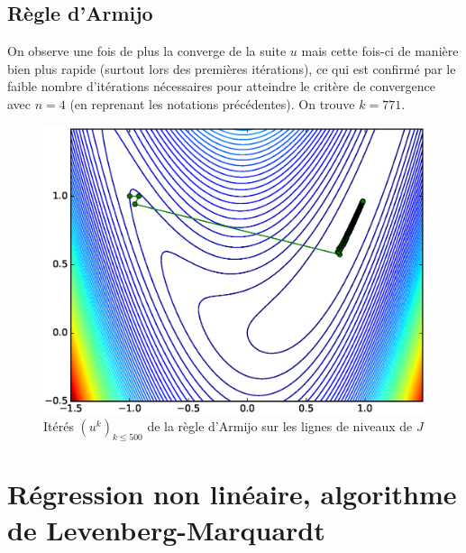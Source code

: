 \documentclass[paper=a4, fontsize=11pt]{article}
\begin{document}
\subsection{Règle d'Armijo}
On observe une fois de plus la converge de la suite $u$ mais cette fois-ci de manière bien plus rapide (surtout lors des premières itérations), ce qui est confirmé par le faible nombre d'itérations nécessaires pour atteindre le critère de convergence avec $n = 4$ (en reprenant les notations précédentes). On trouve $ k = 771$.
\begin{figure}[h]
 	\begin{center}
   \includegraphics[scale=0.6]{suite-u-armijo}
   \end{center}
   \caption{\label{étiquette} Itérés $(u^{k})_{k\leq500}$ de la règle d'Armijo sur les lignes de niveaux de $J$}
\end{figure}

\section{Régression non linéaire, algorithme de Levenberg-Marquardt}
\end{document}
